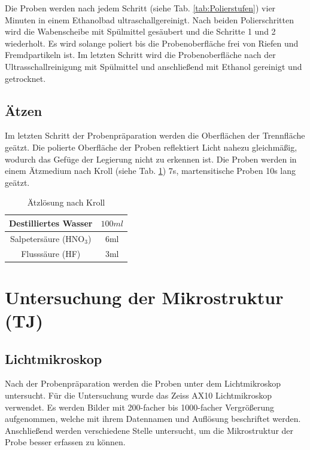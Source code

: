 Die Proben werden nach jedem Schritt (siehe Tab. \ref{tab:Polierstufen}) vier Minuten in einem Ethanolbad ultraschallgereinigt. Nach beiden Polierschritten wird die Wabenscheibe mit Spülmittel gesäubert und die Schritte 1 und 2 wiederholt. Es wird solange poliert bis die Probenoberfläche frei von Riefen und Fremdpartikeln ist. Im letzten Schritt wird die Probenoberfläche nach der Ultrasschallreinigung mit Spülmittel und anschließend mit Ethanol gereinigt und getrocknet. 


\subsection{Ätzen}

Im letzten Schritt der Probenpräparation werden die Oberflächen der Trennfläche geätzt. Die polierte Oberfläche der Proben reflektiert Licht nahezu gleichmäßig, wodurch das Gefüge der Legierung nicht zu erkennen ist. 
Die Proben werden in einem Ätzmedium nach Kroll (siehe Tab. \ref{tab:Ätz_Kroll}) 7s, martensitische Proben 10s lang geätzt. 

\begin{table}[]
	\centering
	\begin{tabular}{|c|c|}
		
		\hline 
		Destilliertes Wasser
		& $100ml$
		\\ 
		\hline 
		Salpetersäure (HNO$_{3}$)	& 6ml
		\\ 
		\hline 
		Flusssäure (HF) & 3ml
		\\ 
		\hline 
	\end{tabular} 
	\caption{Ätzlösung nach Kroll}
	\label{tab:Ätz_Kroll}
\end{table}

\section{Untersuchung der Mikrostruktur (TJ)}

\subsection{Lichtmikroskop}

Nach der Probenpräparation werden die Proben unter dem Lichtmikroskop untersucht. Für die Untersuchung wurde das Zeiss AX10 Lichtmikroskop verwendet. Es werden Bilder mit 200-facher bis 1000-facher Vergrößerung aufgenommen, welche mit ihrem Datennamen und Auflösung beschriftet werden. Anschließend werden verschiedene Stelle untersucht, um die Mikrostruktur der Probe besser erfassen zu können.


